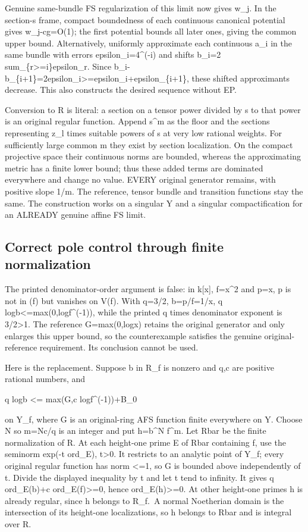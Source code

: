 \documentclass[
  10pt,
]{article}
\begin{document}
Genuine same-bundle FS regularization of this limit now gives w\_j. In
the section-s frame, compact boundedness of each continuous canonical
potential gives \textbar w\_j-cg\textbar=O(1); the first potential
bounds all later ones, giving the common upper bound. Alternatively,
uniformly approximate each continuous a\_i in the same bundle with
errors epsilon\_i=4\^{}(-i) and shifts b\_i=2
sum\_\{r\textgreater=i\}epsilon\_r. Since
b\_i-b\_\{i+1\}=2epsilon\_i\textgreater=epsilon\_i+epsilon\_\{i+1\},
these shifted approximants decrease. This also constructs the desired
sequence without EP.

Conversion to R is literal: a section on a tensor power divided by s to
that power is an original regular function. Append s\^{}m as the floor
and the sections representing z\_l times suitable powers of s at very
low rational weights. For sufficiently large common m they exist by
section localization. On the compact projective space their continuous
norms are bounded, whereas the approximating metric has a finite lower
bound; thus these added terms are dominated everywhere and change no
value. EVERY original generator remains, with positive slope 1/m. The
reference, tensor bundle and transition functions stay the same. The
construction works on a singular Y and a singular compactification for
an ALREADY genuine affine FS limit.

\subsection{Correct pole control through finite
normalization}\label{correct-pole-control-through-finite-normalization}

The printed denominator-order argument is false: in k{[}x{]}, f=x\^{}2
and p=x, p is not in (f) but vanishes on V(f). With q=3/2, b=p/f=1/x, q
log\textbar b\textbar\textless=max(0,log\textbar f\^{}(-1)\textbar),
while the printed q times denominator exponent is 3/2\textgreater1. The
reference G=max(0,log\textbar x\textbar) retains the original generator
and only enlarges this upper bound, so the counterexample satisfies the
genuine original-reference requirement. Its conclusion cannot be used.

Here is the replacement. Suppose b in R\_f is nonzero and q,c are
positive rational numbers, and

q log\textbar b\textbar{} \textless= max(G,c
log\textbar f\^{}(-1)\textbar)+B\_0

on Y\_f, where G is an original-ring AFS function finite everywhere on
Y. Choose N so m=Nc/q is an integer and put h=b\^{}N f\^{}m. Let Rbar be
the finite normalization of R. At each height-one prime E of Rbar
containing f, use the seminorm exp(-t ord\_E), t\textgreater0. It
restricts to an analytic point of Y\_f; every original regular function
has norm \textless=1, so G is bounded above independently of t. Divide
the displayed inequality by t and let t tend to infinity. It gives q
ord\_E(b)+c ord\_E(f)\textgreater=0, hence ord\_E(h)\textgreater=0. At
other height-one primes h is already regular, since h belongs to R\_f.~A
normal Noetherian domain is the intersection of its height-one
localizations, so h belongs to Rbar and is integral over R.
\end{document}
